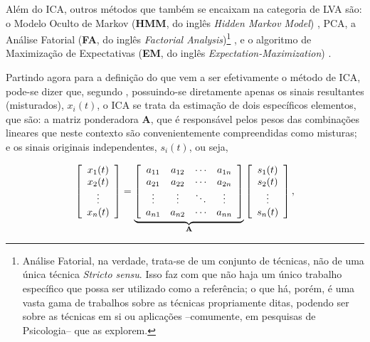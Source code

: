 
Além do ICA, outros métodos que também se encaixam na categoria de LVA são: o Modelo Oculto de Markov (\textbf{HMM}, do inglês \textit{Hidden Markov Model}) \citep{18626}, PCA, a Análise Fatorial (\textbf{FA}, do inglês \textit{Factorial Analysis})\footnote{Análise Fatorial, na verdade, trata-se de um conjunto de técnicas, não de uma única técnica \textit{Stricto sensu}. Isso faz com que não haja um único trabalho específico que possa ser utilizado como a referência; o que há, porém, é uma vasta gama de trabalhos sobre as técnicas propriamente ditas, podendo ser sobre as técnicas em si ou aplicações --comumente, em pesquisas de Psicologia-- que as explorem.} \citep{vincent1953orgin, c63851e778034799a99dcc4d187768d0, doi:10.1177/001316446002000116}, e o algoritmo de Maximização de Expectativas (\textbf{EM}, do inglês \textit{Expectation-Maximization}) \citep{dempster1977maximum}.


Partindo agora para a definição do que vem a ser efetivamente o método de ICA, pode-se dizer que, segundo \citep{hyvarinen2004independent}, possuindo-se diretamente apenas os sinais resultantes (misturados), $x_{i}(t)$, o ICA se trata da estimação de dois específicos elementos, que são: a matriz ponderadora $\mathbf{A}$, que é responsável pelos pesos das combinações lineares que neste contexto são convenientemente compreendidas como misturas; e os sinais originais independentes, $s_{i}(t)$, ou seja,

\begin{equation}
    \left[\begin{array}{c}
        x_{1}(t) \\
        x_{2}(t) \\
        \vdots \\
        x_{n}(t)
    \end{array}\right]
    =
    \underbrace{
    \left[\begin{array}{cccc}
        a_{11} & a_{12} & \cdots & a_{1n} \\
        a_{21} & a_{22} & \cdots & a_{2n} \\
        \vdots & \vdots & \ddots & \vdots \\
        a_{n1} & a_{n2} & \cdots & a_{nn}
    \end{array}\right]}_{\mathbf{A}}
    \left[\begin{array}{c}
        s_{1}(t) \\
        s_{2}(t) \\
        \vdots \\
        s_{n}(t)
    \end{array}\right],
    \vspace{0.2cm}
    \label{eq:bss_ica_mat}
\end{equation}

